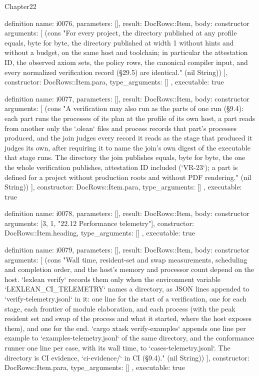 \begin{lexlean}{Chapter22}
\begin{semanticmodule}
definition{
  name: i0076,
  parameters: [],
  result: DocRows::Item,
  body: constructor{
    arguments: [
      (cons "For every project, the directory published at any profile equals, byte for byte, the directory published at width 1 without hints and without a budget, on the same host and toolchain; in particular the attestation ID, the observed axiom sets, the policy rows, the canonical compiler input, and every normalized verification record (§29.5) are identical." (nil String))
    ],
    constructor: DocRows::Item.para,
    type_arguments: []
  },
  executable: true
}

definition{
  name: i0077,
  parameters: [],
  result: DocRows::Item,
  body: constructor{
    arguments: [
      (cons "A verification may also run as the parts of one run (§9.4): each part runs the processes of its plan at the profile of its own host, a part reads from another only the `.olean` files and process records that part's processes produced, and the join judges every record it reads as the stage that produced it judges its own, after requiring it to name the join's own digest of the executable that stage runs. The directory the join publishes equals, byte for byte, the one the whole verification publishes, attestation ID included (`VR-23`); a part is defined for a project without production roots and without PDF rendering." (nil String))
    ],
    constructor: DocRows::Item.para,
    type_arguments: []
  },
  executable: true
}

definition{
  name: i0078,
  parameters: [],
  result: DocRows::Item,
  body: constructor{
    arguments: [3, 1, "22.12 Performance telemetry"],
    constructor: DocRows::Item.heading,
    type_arguments: []
  },
  executable: true
}

definition{
  name: i0079,
  parameters: [],
  result: DocRows::Item,
  body: constructor{
    arguments: [
      (cons "Wall time, resident-set and swap measurements, scheduling and completion order, and the host's memory and processor count depend on the host. `lexlean verify` records them only when the environment variable `LEXLEAN_CI_TELEMETRY` names a directory, as JSON lines appended to `verify-telemetry.jsonl` in it: one line for the start of a verification, one for each stage, each frontier of module elaboration, and each process (with the peak resident set and swap of the process and what it started, where the host exposes them), and one for the end. `cargo xtask verify-examples` appends one line per example to `examples-telemetry.jsonl` of the same directory, and the conformance runner one line per case, with its wall time, to `cases-telemetry.jsonl`. The directory is CI evidence, `ci-evidence/` in CI (§9.4)." (nil String))
    ],
    constructor: DocRows::Item.para,
    type_arguments: []
  },
  executable: true
}


\end{semanticmodule}
\end{lexlean}
